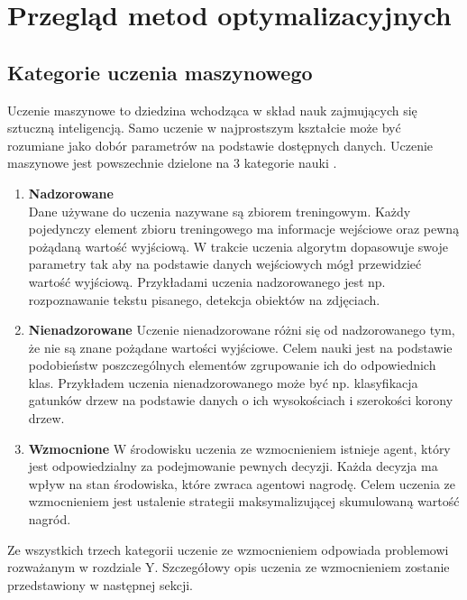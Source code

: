 \documentclass[12pt]{book}
\theoremstyle{plain}
\begin{document}
\chapter{Przegląd metod optymalizacyjnych}
\section{Kategorie uczenia maszynowego}
Uczenie maszynowe to dziedzina wchodząca w skład nauk zajmujących się sztuczną inteligencją. Samo uczenie w najprostszym kształcie może być rozumiane jako dobór parametrów na podstawie dostępnych danych. Uczenie maszynowe jest powszechnie dzielone na 3 kategorie nauki \cite{machineLearningClassification}.
\begin{enumerate}
	\item \textbf{Nadzorowane} \\
	Dane używane do uczenia nazywane są zbiorem treningowym. Każdy pojedynczy element zbioru treningowego ma informacje wejściowe oraz pewną pożądaną wartość wyjściową. W trakcie uczenia algorytm dopasowuje swoje parametry tak aby na podstawie danych wejściowych mógł przewidzieć wartość wyjściową. Przykładami uczenia nadzorowanego jest np. rozpoznawanie tekstu pisanego, detekcja obiektów na zdjęciach.
	\item \textbf{Nienadzorowane}
	Uczenie nienadzorowane różni się od nadzorowanego tym, że nie  są znane pożądane wartości wyjściowe. Celem nauki jest na podstawie podobieństw poszczególnych elementów zgrupowanie ich do odpowiednich klas. Przykładem uczenia nienadzorowanego może być np. klasyfikacja gatunków drzew na podstawie danych o ich wysokościach i szerokości korony drzew.
	\item \textbf{Wzmocnione}
	W środowisku uczenia ze wzmocnieniem istnieje agent, który jest odpowiedzialny za podejmowanie pewnych decyzji. Każda decyzja ma wpływ na stan środowiska, które zwraca agentowi nagrodę. Celem uczenia ze wzmocnieniem jest ustalenie strategii maksymalizującej skumulowaną wartość nagród.
\end{enumerate}
Ze wszystkich trzech kategorii uczenie ze wzmocnieniem odpowiada problemowi rozważanym w rozdziale Y. Szczegółowy opis uczenia ze wzmocnieniem zostanie przedstawiony w następnej sekcji.
\end{document}
